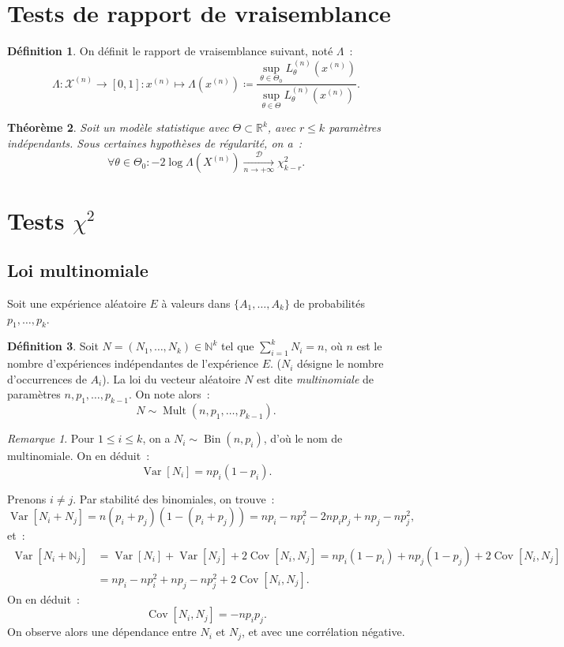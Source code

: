 \documentclass{report}
\DeclareMathOperator{\Bin}{Bin}  %
\DeclareMathOperator{\Mult}{Mult}
\DeclareMathOperator{\Var}{Var}
\DeclareMathOperator{\Cov}{Cov}
\newcommand{\pinfty}{{+\infty}}
\newcommand{\cvgd}{\xrightarrow[n \to \pinfty]{\mathcal D}}
\newcommand{\N}{\mathbb N}
\newcommand{\R}{\mathbb R}
\newcommand{\n}{{(n)}}
\newcommand{\Xn}{{X^\n}}
\newtheorem{thm}{Théorème}[chapter]
\theoremstyle{definition}
\newtheorem{déf}[thm]{Définition}
\theoremstyle{remark}
\newtheorem*{rmq}{Remarque}
\begin{document}
	\section{Tests de rapport de vraisemblance}
		\begin{déf} On définit le rapport de vraisemblance suivant, noté $\Lambda$~:
		\[\Lambda : \mathcal X^\n \to [0, 1] : x^\n \mapsto \Lambda(x^\n)
			\coloneqq\frac {\displaystyle \sup_{\theta \in \Theta_0} L_\theta^\n(x^\n)}{\displaystyle \sup_{\theta \in \Theta} L_\theta^\n(x^\n)}.\]
		\end{déf}

		\begin{thm} Soit un modèle statistique avec $\Theta \subset \R^k$, avec $r \leq k$ paramètres indépendants. Sous certaines hypothèses de régularité, on a~:
		\[\forall \theta \in \Theta_0 : -2\log \Lambda(\Xn) \cvgd \chi^2_{k-r}.\]
		\end{thm}

	\section{Tests $\chi^2$}
		\subsection{Loi multinomiale}
			Soit une expérience aléatoire $E$ à valeurs dans $\{A_1, \ldots, A_k\}$ de probabilités $p_1, \ldots, p_k$.

			\begin{déf} Soit $N = (N_1, \ldots, N_k) \in \N^k$ tel que $\sum_{i=1}^kN_i = n$, où $n$ est le nombre d'expériences indépendantes de l'expérience $E$.
			($N_i$ désigne le nombre d'occurrences de $A_i$). La loi du vecteur aléatoire $N$ est dite \textit{multinomiale} de paramètres $n, p_1, \ldots, p_{k-1}$.
			On note alors~:
			\[N \sim \Mult(n, p_1, \ldots, p_{k-1}).\]
			\end{déf}

			\begin{rmq} Pour $1 \leq i \leq k$, on a $N_i \sim \Bin(n, p_i)$, d'où le nom de multinomiale. On en déduit~:
			\[\Var[N_i] = np_i(1-p_i).\]

			Prenons $i \neq j$. Par stabilité des binomiales, on trouve~:
			\[\Var[N_i + N_j] = n(p_i+p_j)(1 - (p_i+p_j)) = np_i - np_i^2 - 2np_ip_j + np_j - np_j^2,\]
			et~:
			\begin{align*}
				\Var[N_i + \N_j] &= \Var[N_i] + \Var[N_j] + 2\Cov[N_i, N_j] = np_i(1-p_i) + np_j(1-p_j) + 2\Cov[N_i, N_j] \\
				&= np_i - np_i^2 + np_j - np_j^2 + 2\Cov[N_i, N_j].
			\end{align*}
			On en déduit~:
			\[\Cov[N_i, N_j] = -np_ip_j.\]
			On observe alors une dépendance entre $N_i$ et $N_j$, et avec une corrélation négative.
			\end{rmq}
\end{document}
